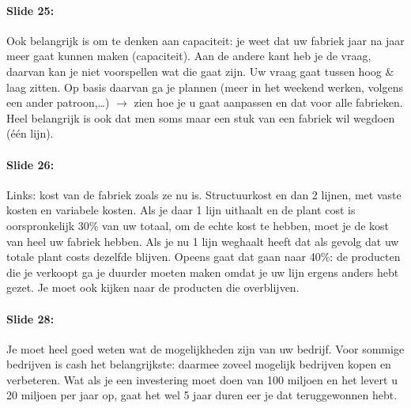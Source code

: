 \documentclass[10pt,a4paper]{report}
\begin{document}
\paragraph{Slide 25:} Ook belangrijk is om te denken aan capaciteit: je weet dat uw fabriek jaar na jaar meer gaat kunnen maken (capaciteit). Aan de andere kant heb je de vraag, daarvan kan je niet voorspellen wat die gaat zijn. Uw vraag gaat tussen hoog $\&$ laag zitten. Op basis daarvan ga je plannen (meer in het weekend werken, volgens een ander patroon,…) $\rightarrow$ zien hoe je u gaat aanpassen en dat voor alle fabrieken. Heel belangrijk is ook dat men soms maar een stuk van een fabriek wil wegdoen (\'e\'en lijn).

\paragraph{Slide 26:} Links: kost van de fabriek zoals ze nu is. Structuurkost en dan 2 lijnen, met vaste kosten en variabele kosten. Als je daar 1 lijn uithaalt en de plant cost is oorspronkelijk 30\% van uw totaal, om de echte kost te hebben, moet je de kost van heel uw fabriek hebben. Als je nu 1 lijn weghaalt heeft dat als gevolg dat uw totale plant costs dezelfde blijven. Opeens gaat dat gaan naar 40\%: de producten die je verkoopt ga je duurder moeten maken omdat je uw lijn ergens anders hebt gezet. Je moet ook kijken naar de producten die overblijven.

\paragraph{Slide 28:} Je moet heel goed weten wat de mogelijkheden zijn van uw bedrijf. Voor sommige bedrijven is cash het belangrijkste: daarmee zoveel mogelijk bedrijven kopen en verbeteren. Wat als je een investering moet doen van 100 miljoen en het levert u 20 miljoen per jaar op, gaat het wel 5 jaar duren eer je dat teruggewonnen hebt.
\end{document}
